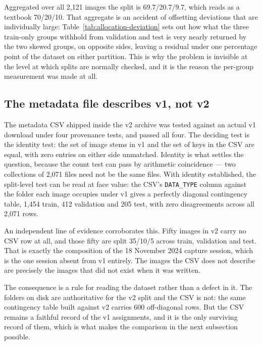 Aggregated over all 2{,}121 images the split is 69.7/20.7/9.7, which reads as a
textbook 70/20/10. That aggregate is an accident of offsetting deviations that
are individually large: Table~\ref{tab:allocation-deviation} sets out how what
the three train-only groups withhold from validation and test is very nearly
returned by the two skewed groups, on opposite sides, leaving a residual under
one percentage point of the dataset on either partition. This is why the problem
is invisible at the level at which splits are normally checked, and it is the
reason the per-group measurement was made at all.



\subsection{The metadata file describes v1, not v2}
\label{sec:metadata-provenance}

The metadata CSV shipped inside the v2 archive was tested against an actual v1
download under four provenance tests, and passed all four. The deciding test is
the identity test: the set of image stems in v1 and the set of keys in the CSV
are equal, with zero entries on either side unmatched. Identity is what settles
the question, because the count test can pass by arithmetic coincidence --- two
collections of 2{,}071 files need not be the same files. With identity
established, the split-level test can be read at face value: the CSV's
\texttt{DATA\_TYPE} column against the folder each image occupies under v1 gives
a perfectly diagonal contingency table, 1{,}454 train, 412 validation and 205
test, with zero disagreements across all 2{,}071 rows.

An independent line of evidence corroborates this. Fifty images in v2 carry no
CSV row at all, and those fifty are split 35/10/5 across train, validation and
test. That is exactly the composition of the 18 November 2024 capture session,
which is the one session absent from v1 entirely. The images the CSV does not
describe are precisely the images that did not exist when it was written.

The consequence is a rule for reading the dataset rather than a defect in it. The
folders on disk are authoritative for the v2 split and the CSV is not: the same
contingency table built against v2 carries 600 off-diagonal rows. But the CSV
remains a faithful record of the v1 assignments, and it is the only surviving
record of them, which is what makes the comparison in the next subsection
possible.

